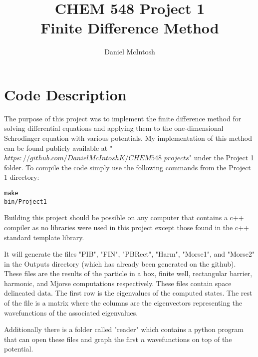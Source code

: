 \documentclass{article}
\title{CHEM 548 Project 1\\Finite Difference Method}
\author{Daniel McIntosh}
\begin{document}
\maketitle

\section*{Code Description}
The purpose of this project was to implement the finite difference method for solving differential equations and applying them to the one-dimensional Schrodinger equation with various potentials. My implementation of this method can be found publicly available at "$https://github.com/DanielMcIntoshK/CHEM548\_projects$" under the Project 1 folder. To compile the code simply use the following commands from the Project 1 directory:

\begin{lstlisting}
make
bin/Project1
\end{lstlisting}

Building this project should be possible on any computer that contains a c++ compiler as no libraries were used in this project except those found in the c++ standard template library.

It will generate the files "PIB", "FIN", "PBRect", "Harm", "Morse1", and "Morse2" in the Outputs directory (which has already been generated on the github). These files are the results of the particle in a box, finite well, rectangular barrier, harmonic, and Mjorse computations respectively. These files contain space delineated data. The first row is the eigenvalues of the computed states. The rest of the file is a matrix where the columns are the eigenvectors representing the wavefunctions of the associated eigenvalues.

Additionally there is a folder called "reader" which contains a python program that can open these files and graph the first $n$ wavefunctions on top of the potential.
\end{document}
